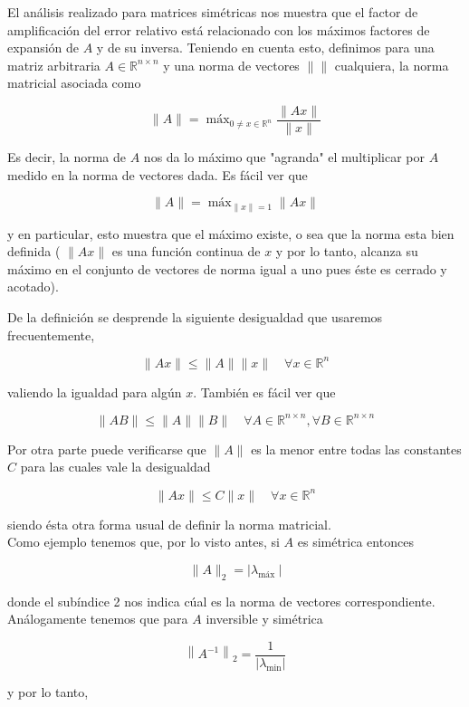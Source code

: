 \documentclass[10pt]{article}
\begin{document}
El análisis realizado para matrices simétricas nos muestra que el factor de amplificación del error relativo está relacionado con los máximos factores de expansión de $A$ y de su inversa. Teniendo en cuenta esto, definimos para una matriz arbitraria $A \in \mathbb{R}^{n \times n}$ y una norma de vectores $\|\|$ cualquiera, la norma matricial asociada como

$$
\|A\|=\operatorname{máx}_{0 \neq x \in \mathbb{R}^{n}} \frac{\|A x\|}{\|x\|}
$$

Es decir, la norma de $A$ nos da lo máximo que "agranda" el multiplicar por $A$ medido en la norma de vectores dada. Es fácil ver que

$$
\|A\|=\operatorname{máx}_{\|x\|=1}\|A x\|
$$

y en particular, esto muestra que el máximo existe, o sea que la norma esta bien definida ( $\|A x\|$ es una función continua de $x$ y por lo tanto, alcanza su máximo en el conjunto de vectores de norma igual a uno pues éste es cerrado y acotado).

De la definición se desprende la siguiente desigualdad que usaremos frecuentemente,

$$
\|A x\| \leq\|A\|\|x\| \quad \forall x \in \mathbb{R}^{n}
$$

valiendo la igualdad para algún $x$. También es fácil ver que


\begin{equation*}
\|A B\| \leq\|A\|\|B\| \quad \forall A \in \mathbb{R}^{n \times n}, \forall B \in \mathbb{R}^{n \times n} \tag{2.4}
\end{equation*}


Por otra parte puede verificarse que $\|A\|$ es la menor entre todas las constantes $C$ para las cuales vale la desigualdad

$$
\|A x\| \leq C\|x\| \quad \forall x \in \mathbb{R}^{n}
$$

siendo ésta otra forma usual de definir la norma matricial.\\
Como ejemplo tenemos que, por lo visto antes, si $A$ es simétrica entonces

$$
\|A\|_{2}=\left|\lambda_{\text {máx }}\right|
$$

donde el subíndice 2 nos indica cúal es la norma de vectores correspondiente.\\
Análogamente tenemos que para $A$ inversible y simétrica

$$
\left\|A^{-1}\right\|_{2}=\frac{1}{\left|\lambda_{\min }\right|}
$$

y por lo tanto,
\end{document}
